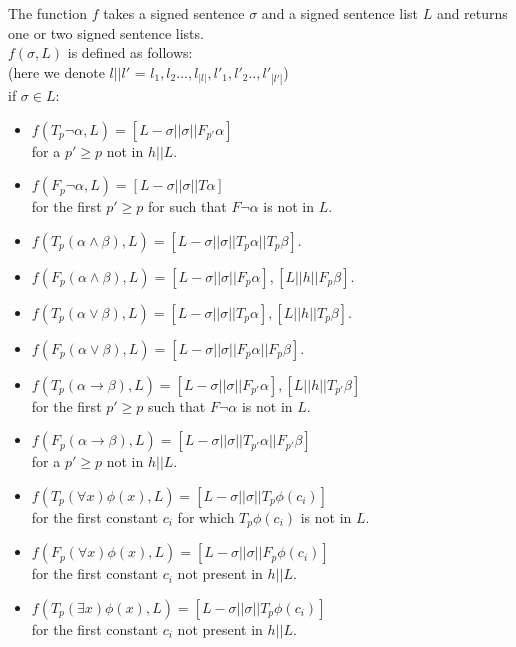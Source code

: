 \documentclass[runningheads]{llncs}
\begin{document}
\begin{definition}
    The function $f$ takes a signed sentence $\sigma$ and a signed sentence list $L$ and returns one or two signed sentence lists.  \\$f(\sigma,L)$ is defined as follows:
    \\(here we denote $l||l'$ = $l_1,l_2...,l_{|l|}, l'_1,l'_2..,l'_{|l'|} $)
    \\if $\sigma \in L$:
        \begin{itemize}
            \item $f(T_{p} \neg \alpha,L) = [L - \sigma|| \sigma || F_{p'}\alpha] $ \\ for a $p' \geq p$ not in $h||L$.
            \item $f(F_{p} \neg \alpha,L) = [L - \sigma || \sigma || T \alpha]$ \\for the first $p' \geq p$ for such that $F \neg \alpha$ is not in $L$.
            \item $f(T_{p} (\alpha \land \beta), L) = [L - \sigma|| \sigma || T_{p} \alpha || T_{p} \beta]$.
            \item $f(F_{p} (\alpha \land \beta), L) = [L - \sigma|| \sigma || F_{p} \alpha],[ L || h || F_{p} \beta]$.
            \item $f(T_{p} (\alpha \lor \beta), L) = [L - \sigma|| \sigma || T_{p} \alpha],[ L || h || T_{p} \beta]$.
            \item $f(F_{p} (\alpha \lor \beta), L) = [L - \sigma|| \sigma || F_{p} \alpha || F_{p} \beta]$.
            \item $f(T_{p} (\alpha \to \beta), L) = [L - \sigma|| \sigma || F_{p'} \alpha],[ L || h || T_{p'} \beta]$ \\for the first $p' \geq p$ such that  $F \neg \alpha$ is not in $L$.
            \item $f(F_{p} (\alpha \to \beta), L) = [L - \sigma|| \sigma || T_{p'} \alpha || F_{p'} \beta]$ \\for a $p' \geq p$ not in $h||L$.
            \item $f(T_{p} (\forall x) \phi(x), L) = [L - \sigma|| \sigma || T_{p} \phi(c_i) ]$\\ for the first constant $c_i$ for which $T_{p} \phi(c_i)$ is not in $L$.
            \item $f(F_{p} (\forall x) \phi(x), L) = [L - \sigma|| \sigma || F_{p} \phi(c_i) ]$\\ for the first constant $c_i$ not present in $h||L$.
            \item $f(T_{p} (\exists x) \phi(x), L) = [L - \sigma|| \sigma || T_{p} \phi(c_i) ]$ \\for the first constant $c_i$ not present in $h||L$.

\end{itemize}
\end{definition}
\end{document}
